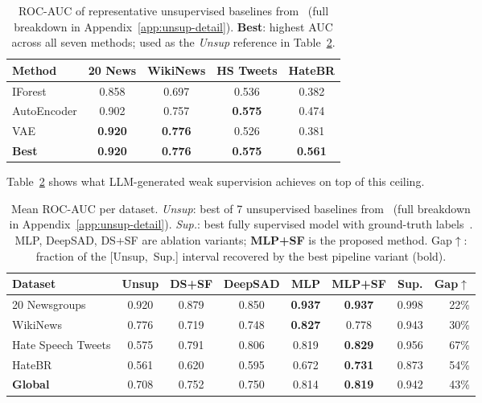 \documentclass[12pt]{article}
\begin{document}
\renewcommand{\arraystretch}{0.9}
\begin{table}[ht]
\small
\centering
\caption{ROC-AUC of representative unsupervised baselines from~\cite{stil}
         (full breakdown in Appendix~\ref{app:unsup-detail}).
         \textbf{Best}: highest AUC across all seven methods; used as the
         \textit{Unsup} reference in Table~\ref{tab:main-results}.}
\label{tab:unsup-baselines}
\begin{tabular}{lcccc}
\toprule
\textbf{Method} & \textbf{20 News} & \textbf{WikiNews} & \textbf{HS Tweets} & \textbf{HateBR} \\
\midrule
IForest      & 0.858 & 0.697 & 0.536 & 0.382 \\
AutoEncoder  & 0.902 & 0.757 & \textbf{0.575} & 0.474 \\
VAE          & \textbf{0.920} & \textbf{0.776} & 0.526 & 0.381 \\
\midrule
\textbf{Best} & \textbf{0.920} & \textbf{0.776} & \textbf{0.575} & \textbf{0.561} \\
\bottomrule
\end{tabular}
\end{table}

Table~\ref{tab:main-results} shows what LLM-generated weak supervision achieves on top of this ceiling.

\renewcommand{\arraystretch}{0.9}
\begin{table}[ht]
\small
\centering
\caption{Mean ROC-AUC per dataset. \textit{Unsup}: best of 7 unsupervised
         baselines from~\cite{stil} (full breakdown in Appendix~\ref{app:unsup-detail}).
         \textit{Sup.}: best fully supervised model with ground-truth labels~\cite{stil}.
         MLP, DeepSAD, DS+SF are ablation variants; \textbf{MLP+SF} is the proposed method.
         Gap$\uparrow$: fraction of the \mbox{[Unsup, Sup.]} interval recovered by the best pipeline variant (bold).}
\label{tab:main-results}
\begin{tabular}{lcccccc r}
\toprule
\textbf{Dataset} & \textbf{Unsup} & \textbf{DS+SF} & \textbf{DeepSAD} & \textbf{MLP} & \textbf{MLP+SF} & \textbf{Sup.} & \textbf{Gap$\uparrow$} \\
\midrule
20 Newsgroups      & 0.920 & 0.879 & 0.850 & \textbf{0.937} & \textbf{0.937} & 0.998 & 22\% \\
WikiNews           & 0.776 & 0.719 & 0.748 & \textbf{0.827} & 0.778 & 0.943 & 30\% \\
Hate Speech Tweets & 0.575 & 0.791 & 0.806 & 0.819 & \textbf{0.829} & 0.956 & 67\% \\
HateBR             & 0.561 & 0.620 & 0.595 & 0.672 & \textbf{0.731} & 0.873 & 54\% \\
\midrule
\textbf{Global}    & 0.708 & 0.752 & 0.750 & 0.814 & \textbf{0.819} & 0.942 & 43\% \\
\bottomrule
\end{tabular}
\end{table}
\end{document}
